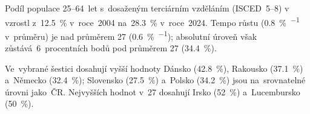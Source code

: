Podíl populace 25--64~let s~dosaženým terciárním vzděláním (\acs{ISCED}~5--8) v~ vzrostl z~\SI{12,5}{\percent} v~roce~2004 na~\SI{28,3}{\percent} v~roce~2024. Tempo růstu (\SI{0,8}{\percent\per\year} v~průměru) je nad průměrem 27 (\SI{0,6}{\percent\per\year}); absolutní úroveň však zůstává~\SI{6}{}~procentních bodů pod průměrem 27 (\SI{34,4}{\percent}).

Ve~vybrané šestici dosahují vyšší hodnoty Dánsko (\SI{42,8}{\percent}), Rakousko (\SI{37,1}{\percent}) a~Německo (\SI{32,4}{\percent}); Slovensko (\SI{27,5}{\percent}) a~Polsko (\SI{34,2}{\percent}) jsou na~srovnatelné úrovni jako~\ac{ČR}. Nejvyšších hodnot v~27 dosahují Irsko (\SI{52}{\percent}) a~Lucembursko (\SI{50}{\percent}).


